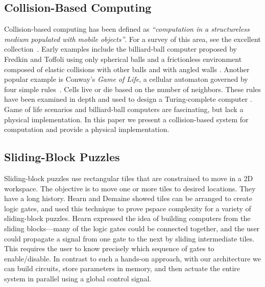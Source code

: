 \documentclass[letterpaper, 10 pt, conference]{ieeeconf}
\begin{document}
\subsection{Collision-Based Computing}
Collision-based computing has been defined as \emph{``computation in a structureless medium populated with mobile objects''}.  For a survey of this area, see the excellent collection~\cite{Adamatzky2012}. Early examples include the billiard-ball computer proposed by Fredkin and Toffoli using only spherical balls and a frictionless environment composed of elastic collisions with other balls and with angled walls \cite{Fredkin1982ConservativeLogic}. Another popular example is Conway's {\em Game of Life}, a cellular automaton governed by four simple rules~\cite{berlekamp2001winning}. Cells live or die based on the number of neighbors. These rules have been examined in depth and used to design a Turing-complete computer \cite{Adamatzky2002}.  Game of life scenarios and billiard-ball computers are fascinating, but lack a physical implementation.  In this paper we present a collision-based system for computation and provide a physical implementation.


\subsection{Sliding-Block Puzzles}
Sliding-block puzzles use rectangular tiles that are constrained to move in a 2D workspace. The objective is to move one or more tiles to desired locations. They have a long history.
Hearn \cite{hearn2005complexity} and Demaine \cite{Demaine2009} showed tiles can be arranged to create logic gates, and used this technique to prove {\sc pspace} complexity for a variety of sliding-block puzzles.  Hearn expressed the idea of building computers from the sliding blocks---many of the logic gates could be connected together, and the user could propagate a signal from one gate to the next by sliding intermediate tiles.  This requires the user to know precisely which sequence of gates to enable/disable.  In contrast to such a hands-on approach, with our architecture we can build circuits, store parameters in memory, and then actuate the entire system in parallel using a global control signal.
\end{document}
